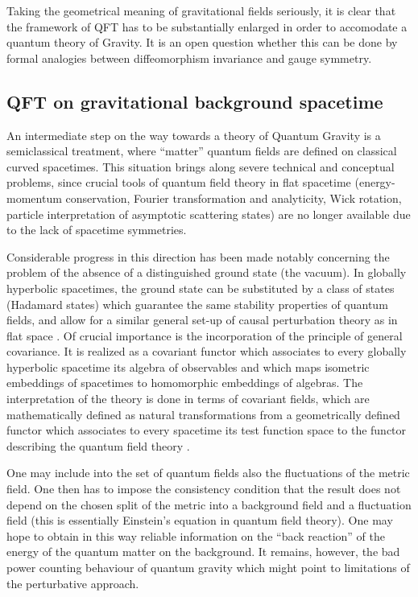 \documentclass[multphys,vecphys]{svmult}
\begin{document}
Taking the geometrical meaning of gravitational fields seriously, it
is clear that the framework of QFT has to be substantially enlarged in
order to accomodate a quantum theory of Gravity. It is
an open question whether this can be done by formal analogies between 
diffeomorphism invariance and gauge symmetry. 

\subsection{QFT on gravitational background spacetime}\label{CST}

An intermediate step on the way towards a theory of Quantum Gravity is a
semiclassical treatment, where ``matter'' quantum fields are defined
on classical curved spacetimes. This situation
brings along severe technical and conceptual problems, since crucial
tools of quantum field theory in flat spacetime (energy-momentum
conservation, Fourier transformation and analyticity, Wick rotation,
particle interpretation of asymptotic
scattering states) are no longer available due to
the lack of spacetime symmetries.    

Considerable progress in this direction has been made notably
concerning the problem of the absence of a distinguished
ground state (the vacuum). In globally hyperbolic
spacetimes, the ground state can be substituted by a class of
states (Hadamard states) which guarantee 
the same stability properties of quantum fields, and allow for a
similar general set-up of causal perturbation theory as in flat space \cite{HW}. Of crucial importance
is the incorporation of the principle of general
covariance. It is realized as a covariant
functor which associates to every globally hyperbolic spacetime its
algebra of observables and which maps isometric embeddings of
spacetimes to homomorphic embeddings of algebras. The interpretation
of the theory is done in terms of covariant fields, which are
mathematically defined as natural transformations from a geometrically
defined functor which associates to every spacetime its test function
space to the functor describing the quantum field theory \cite{BFV}. 

One may include into the set of quantum fields also the fluctuations
of the metric field. One then has to impose the consistency condition
that the result does not depend on the chosen split of the metric into
a background field and a fluctuation field (this is
essentially Einstein's equation in quantum field theory). One may hope
to obtain in this way reliable information on the ``back reaction'' of
the energy of the quantum matter on the background. It remains,
however, the bad power counting behaviour of
quantum gravity which might point to limitations of the
perturbative approach.    
\end{document}
